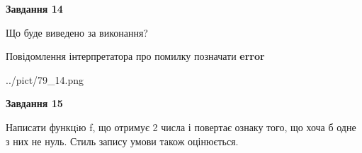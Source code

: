 \documentclass[11pt, ukrainian]{article}
\begin{document}
{\begin {large}
{\begin {center}\textbf{Завдання 14}\end {center}}\par
Що буде виведено за виконання? \par
Повідомлення інтерпретатора про помилку позначати \textbf{error}

\begin{center}
	{../pict/79_14.png}
\end{center}
\newpage

{\begin {center}\textbf{Завдання 15}\end {center}}\par

Написати функцiю f, що отримує 2 числа і повертає ознаку того, що хоча б одне з них не нуль. Стиль запису умови також оцінюється.\par
\newpage

\end {large}}
\end{document}
